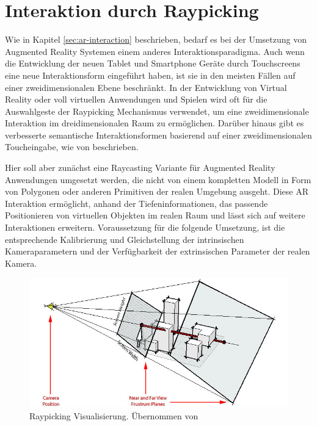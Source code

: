 \section{Interaktion durch Raypicking} \label{sec:ar-depth-interaction}

Wie in Kapitel \ref{sec:ar-interaction} beschrieben, bedarf es bei der Umsetzung von Augmented Reality Systemen einem anderes Interaktionsparadigma. Auch wenn die Entwicklung der neuen Tablet und Smartphone Geräte durch Touchscreens eine neue Interaktionsform eingeführt haben, ist sie in den meisten Fällen auf einer zweidimensionalen Ebene beschränkt. In der Entwicklung von Virtual Reality oder voll virtuellen Anwendungen und Spielen wird oft für die Auswahlgeste der Raypicking Mechanismus verwendet, um eine zweidimensionale Interaktion im dreidimensionalen Raum zu ermöglichen. Darüber hinaus gibt es verbesserte semantische Interaktionsformen basierend auf einer zweidimensionalen Toucheingabe, wie von \citet{elmqvist2008semantic} beschrieben.

Hier soll aber zunächst eine Raycasting Variante für Augmented Reality Anwendungen umgesetzt werden, die nicht von einem kompletten Modell in Form von Polygonen oder anderen Primitiven der realen Umgebung ausgeht. Diese AR Interaktion ermöglicht, anhand der Tiefeninformationen, das passende Positionieren von virtuellen Objekten im realen Raum und lässt sich auf weitere Interaktionen erweitern. Voraussetzung für die folgende Umsetzung, ist die entsprechende Kalibrierung und Gleichstellung der intrinsischen Kameraparametern und der Verfügbarkeit der extrinsischen Parameter der realen Kamera. 

\begin{figure}[h]
  \centering
	\includegraphics[width=1.0\textwidth]{content/images/methods/interaction.jpg} 
  \caption{Raypicking Visualisierung. Übernommen von \citet{gluUn11:online}}
  \label{fig:interaction}
\end{figure}

